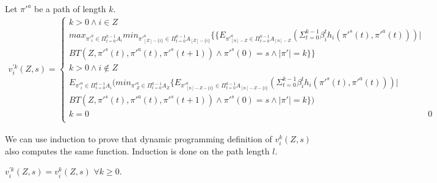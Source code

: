 
Let $\pi'^a$ be a path of length $k$.
\begin{equation}
\begin{split}
v_i^{'k}(Z,s)=
\begin{cases}
k > 0 \wedge i \in Z \\
max_{\pi'^{a}_{i} \in \Pi_{t=0}^{k-1} A_{i}}
min_{\pi'^{a}_{[Z]-\{i\}} \in \Pi_{t=0}^{k-1} A_{[Z]-\{i\}}}
\{\{E_{\pi'^{a}_{[n]-Z} \in \Pi_{t=0}^{k-1} A_{[n]-Z}}(\Sigma_{t=0}^{k-1} \beta_i^{t}h_{i}(\pi'^{s}(t),\pi'^{a}(t))) |\\ BT(Z,\pi'^{s}(t),\pi'^{a}(t),\pi'^{s}(t+1)) \wedge \pi'^{s}(0)=s \wedge |\pi'|=k\}\}\\
k > 0 \wedge i \notin Z & \\
E_{\pi'^{a}_{i} \in \Pi_{t=0}^{k-1} A_{i}}
(min_{\pi'^{a}_{Z} \in \Pi_{t=0}^{k-1} A_{Z}}
\{E_{\pi'^{a}_{[n]-Z-\{i\}} \in \Pi_{t=0}^{k-1} A_{[n]-Z-\{i\}}}
(\Sigma_{t=0}^{k-1} \beta_i^{t}h_{i}(\pi'^{s}(t),\pi'^{a}(t))) |\\ BT(Z,\pi'^{s}(t),\pi'^{a}(t),\pi'^{s}(t+1)) \wedge \pi'^{s}(0)=s \wedge |\pi'|=k\})\\
k = 0 & 0\\
\end{cases}
\end{split}
\end{equation}

We can use induction to prove that dynamic programming definition of $v_i^{k}(Z,s)$ also computes the same function. Induction is done on the path length $l$.\cite{MMS08} \newline

\begin{theorem}
	$v_i^{'k}(Z,s)=v_i^{k}(Z,s)$  $ \forall k \ge 0 $.
\end{theorem}
	

